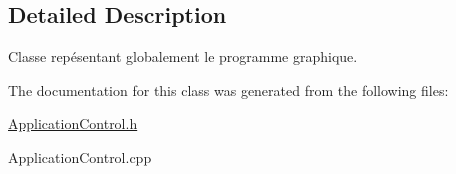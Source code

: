 \subsection{Detailed Description}
Classe repésentant globalement le programme graphique. 

The documentation for this class was generated from the following files\+:\begin{DoxyCompactItemize}
\item 
\hyperlink{ApplicationControl_8h}{Application\+Control.\+h}\item 
Application\+Control.\+cpp\end{DoxyCompactItemize}
